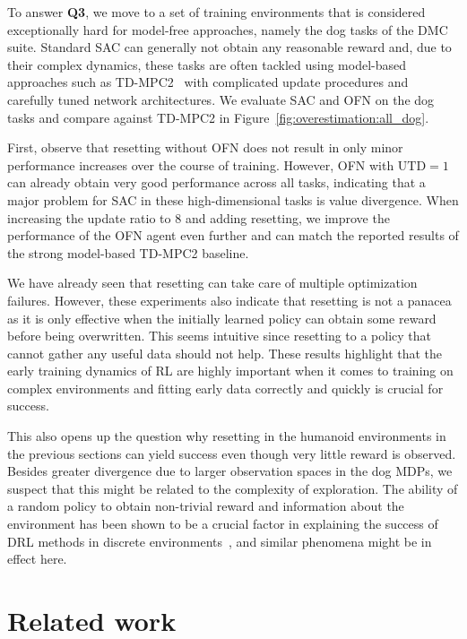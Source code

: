 To answer \textbf{Q3}, we move to a set of training environments that is considered exceptionally hard for model-free approaches, namely the dog tasks of the DMC suite. Standard SAC can generally not obtain any reasonable reward and, due to their complex dynamics, these tasks are often tackled using model-based approaches such as TD-MPC2~\parencite{hansen2024tdmpc} with complicated update procedures and carefully tuned network architectures. We evaluate SAC and OFN on the dog tasks and compare against TD-MPC2 in Figure~\ref{fig:overestimation:all_dog}.

First, observe that resetting without OFN does not result in only minor performance increases over the course of training. However, OFN with $\mathrm{UTD}=1$ can already obtain very good performance across all tasks, indicating that a major problem for SAC in these high-dimensional tasks is value divergence. When increasing the update ratio to $8$ and adding resetting, we improve the performance of the OFN agent even further and can match the reported results of the strong model-based TD-MPC2 baseline. 

We have already seen that resetting can take care of multiple optimization failures. However, these experiments also indicate that resetting is not a panacea as it is only effective when the initially learned policy can obtain some reward before being overwritten. 
This seems intuitive since resetting to a policy that cannot gather any useful data should not help. 
These results highlight that the early training dynamics of RL are highly important when it comes to training on complex environments and fitting early data correctly and quickly is crucial for success. 

This also opens up the question why resetting in the humanoid environments in the previous sections can yield success even though very little reward is observed. 
Besides greater divergence due to larger observation spaces in the dog MDPs, we suspect that this might be related to the complexity of exploration.
The ability of a random policy to obtain non-trivial reward and information about the environment has been shown to be a crucial factor in explaining the success of DRL methods in discrete environments~\parencite{laidlaw2023bridging}, and similar phenomena might be in effect here. 




\section{Related work}


